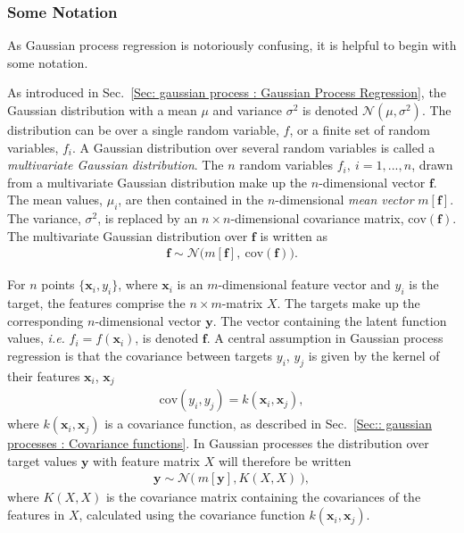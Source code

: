 \documentclass[twoside,english]{uiofysmaster}
\begin{document}
{{\subsubsection{Some Notation}

As Gaussian process regression is notoriously confusing, it is helpful to begin with some notation. 

As introduced in Sec.~\ref{Sec: gaussian process : Gaussian Process Regression}, the Gaussian distribution with a mean $\mu$ and variance $\sigma^2$ is denoted $\mathcal{N}(\mu, \sigma^2)$. The distribution can be over a single random variable, $f$, or a finite set of random variables, $f_i$. A Gaussian distribution over several random variables is called a \textit{multivariate Gaussian distribution}. The $n$ random variables $f_i, ~i=1,...,n$, drawn from a multivariate Gaussian distribution make up the $n$-dimensional vector $\textbf{f}$. The mean values, $\mu_i$, are then contained in the $n$-dimensional \textit{mean vector} $m[\textbf{f}]$. The variance, $\sigma^2$, is replaced by an $n \times n$-dimensional covariance matrix, $\text{cov}(\textbf{f})$. The multivariate Gaussian distribution over $\textbf{f}$ is written as
\begin{align}
\textbf{f} \sim \mathcal{N} \big(m[\textbf{f}], ~\text{cov}(\textbf{f})  \big).
\end{align}  

For $n$ points $\{\textbf{x}_i , y_i\}$, where $\textbf{x}_i$ is an $m$-dimensional feature vector and $y_i$ is the target, the features comprise the $n \times m$-matrix $X$. The targets make up the corresponding $n$-dimensional vector $\textbf{y}$. The vector containing the latent function values, \textit{i.e.} $f_i = f(\textbf{x}_i)$, is denoted $\textbf{f}$. A central assumption in Gaussian process regression is that the covariance between targets $y_i$, $y_j$ is given by the kernel of their features $\textbf{x}_i$, $\textbf{x}_j$
\begin{align}\label{Eq:: gaussian process : cov(y) gaussian process}
\text{cov}(y_i, y_j) = k(\textbf{x}_i, \textbf{x}_j),
\end{align}
where $k(\textbf{x}_i, \textbf{x}_j)$ is a covariance function, as described in Sec.~\ref{Sec:: gaussian processes : Covariance functions}. In Gaussian processes the distribution over target values $\textbf{y}$ with feature matrix $X$ will therefore be written
\begin{align}\label{Eq:: gaussian process : Normal distribution GP}
\textbf{y} \sim \mathcal{N} \big(~m[ \textbf{y} ], K(X, X) ~\big),
\end{align}
where $K(X,X)$ is the covariance matrix containing the covariances of the features in $X$, calculated using the covariance function $k(\textbf{x}_i, \textbf{x}_j)$.

}}
\end{document}
